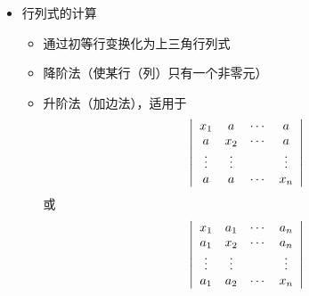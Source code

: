 \begin{frame}
  
    \begin{itemize}
    \item 行列式的计算
      \begin{itemize}
      \item 通过初等行变换化为上三角行列式
      \item 降阶法（使某行（列）只有一个非零元）
      \item 升阶法（加边法），适用于
        $$
    \left|
    \begin{array}{cccc}
      x_1 &  a  & \cdots & a   \\
      a   & x_2 & \cdots & a   \\
      \vdots & \vdots &     & \vdots \\
      a   &  a  & \cdots & x_n
    \end{array}
    \right|
    $$
    或
    $$
    \left|
    \begin{array}{cccc}
      x_1 & a_1  & \cdots & a_n   \\
      a_1 & x_2 & \cdots  & a_n   \\
      \vdots & \vdots &     & \vdots \\
      a_1 & a_2  & \cdots & x_n
    \end{array}
    \right|
    $$
      \end{itemize}
    \end{itemize}
  
\end{frame}



